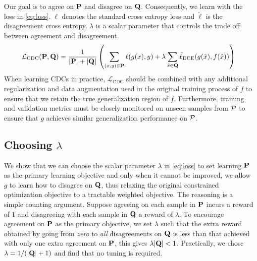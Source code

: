 Our goal is to agree on $\mathbf{P}$ and disagree on $\mathbf{Q}$.
Consequently, we learn with the loss in \autoref{eq:loss}. $\ell$ denotes the standard cross entropy loss and $\tilde{\ell}$ is the disagreement cross entropy. $\lambda$ is a scalar parameter that controls the trade off between agreement and disagreement.
\begin{equation}
    \mathcal{L}_{\text{CDC}}(\mathbf{P},\mathbf{Q}) = \frac{1}{|\mathbf{P}|+|\mathbf{Q}|}\left(\sum_{(x,y)\in \mathbf{P}} \ell(g(x), y) + \lambda \sum_{\tilde{x}\in \mathbf{Q}} \tilde{\ell}_{\text{DCE}}(g(\tilde{x}), f(\tilde{x})) \right)
    \label{eq:loss}
\end{equation}
When learning CDCs in practice, $\mathcal{L}_\text{CDC}$ should be combined with any additional regularization and data augmentation used in the original training process of $f$ to ensure that we retain the true generalization region of $f$.
Furthermore, training and validation metrics must be closely monitored on unseen samples from $\mathcal{P}$ to ensure that $g$ achieves similar generalization performance on $\mathcal{P}$.

\subsection{Choosing $\lambda$}
We show that we can choose the scalar parameter $\lambda$ in \autoref{eq:loss} to set learning $\mathbf{P}$ as the primary learning objective and only when it cannot be improved, we allow $g$ to learn how to disagree on $\mathbf{Q}$,
thus relaxing the original constrained optimization objective to a tractable weighted objective.
The reasoning is a simple counting argument.
Suppose agreeing on each sample in $\mathbf{P}$ incurs a reward of $1$ and disagreeing with each sample in $\mathbf{Q}$ a reward of $\lambda$.
To encourage agreement on $\mathbf{P}$ as the primary objective, we set $\lambda$ such that the extra reward obtained by going from \textit{zero} to \textit{all} disagreements on $\mathbf{Q}$ is less than that achieved with only one extra agreement on $\mathbf{P}$, this gives $\lambda|\mathbf{Q}| < 1$.
Practically, we chose $\lambda=1/(|\mathbf{Q}| + 1)$ and find that no tuning is required.

